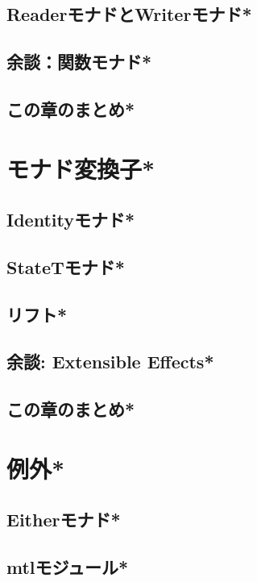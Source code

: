\documentclass[a5paper,twoside,fleqn,draft]{jsbook}
\begin{document}
\section{ReaderモナドとWriterモナド*}
\section{余談：関数モナド*}
\section{この章のまとめ*}

\chapter{モナド変換子*}
\section{Identityモナド*}
\section{StateTモナド*}
\section{リフト*}
\section{余談: Extensible Effects*}
\section{この章のまとめ*}

\chapter{例外*}
\section{Eitherモナド*}
\section{mtlモジュール*}
\end{document}
